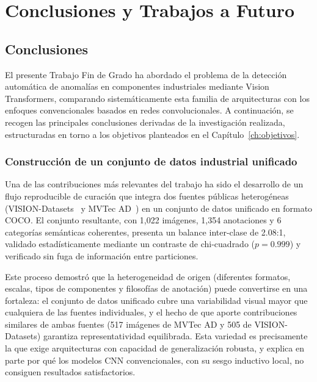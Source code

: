 \chapter{Conclusiones y Trabajos a Futuro}
\label{ch:conclusiones}

\section{Conclusiones}
\label{sec:conclusiones}

El presente Trabajo Fin de Grado ha abordado el problema de la detección automática de anomalías en componentes industriales mediante Vision Transformers, comparando sistemáticamente esta familia de arquitecturas con los enfoques convencionales basados en redes convolucionales. A continuación, se recogen las principales conclusiones derivadas de la investigación realizada, estructuradas en torno a los objetivos planteados en el Capítulo~\ref{ch:objetivos}.

\subsection{Construcción de un conjunto de datos industrial unificado}

Una de las contribuciones más relevantes del trabajo ha sido el desarrollo de un flujo reproducible de curación que integra dos fuentes públicas heterogéneas (VISION-Datasets~\cite{bai2023visiondatasets} y MVTec AD~\cite{bergmann2019mvtec}) en un conjunto de datos unificado en formato COCO. El conjunto resultante, con 1{,}022 imágenes, 1{,}354 anotaciones y 6 categorías semánticas coherentes, presenta un balance inter-clase de 2.08:1, validado estadísticamente mediante un contraste de chi-cuadrado ($p = 0.999$) y verificado sin fuga de información entre particiones.

Este proceso demostró que la heterogeneidad de origen (diferentes formatos, escalas, tipos de componentes y filosofías de anotación) puede convertirse en una fortaleza: el conjunto de datos unificado cubre una variabilidad visual mayor que cualquiera de las fuentes individuales, y el hecho de que aporte contribuciones similares de ambas fuentes (517 imágenes de MVTec AD y 505 de VISION-Datasets) garantiza representatividad equilibrada. Esta variedad es precisamente la que exige arquitecturas con capacidad de generalización robusta, y explica en parte por qué los modelos CNN convencionales, con su sesgo inductivo local, no consiguen resultados satisfactorios.

